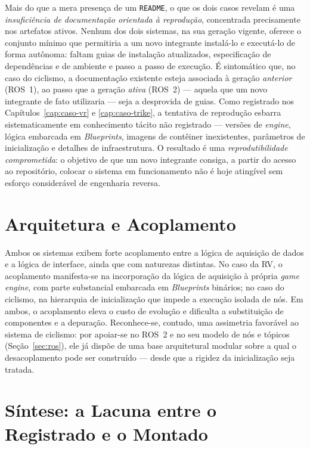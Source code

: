 Mais do que a mera presença de um \texttt{README}, o que os dois casos revelam é uma
\emph{insuficiência de documentação orientada à reprodução}, concentrada precisamente nos
artefatos ativos. Nenhum dos dois sistemas, na sua geração vigente, oferece o conjunto
mínimo que permitiria a um novo integrante instalá-lo e executá-lo de forma autônoma:
faltam guias de instalação atualizados, especificação de dependências e de ambiente e passo
a passo de execução. É sintomático que, no caso do ciclismo, a documentação existente esteja
associada à geração \emph{anterior} (ROS~1), ao passo que a geração \emph{ativa} (ROS~2)
--- aquela que um novo integrante de fato utilizaria --- seja a desprovida de guias. Como
registrado nos Capítulos~\ref{cap:caso-vr} e \ref{cap:caso-trike}, a tentativa de reprodução
esbarra sistematicamente em conhecimento tácito não registrado --- versões de \emph{engine},
lógica embarcada em \emph{Blueprints}, imagens de contêiner inexistentes, parâmetros de
inicialização e detalhes de infraestrutura. O resultado é uma \emph{reprodutibilidade
comprometida}: o objetivo de que um novo integrante consiga, a partir do acesso ao
repositório, colocar o sistema em funcionamento não é hoje atingível sem esforço
considerável de engenharia reversa.

\section{Arquitetura e Acoplamento}
\label{sec:diag-arq}

Ambos os sistemas exibem forte acoplamento entre a lógica de aquisição de dados e a lógica
de interface, ainda que com naturezas distintas. No caso da RV, o acoplamento manifesta-se
na incorporação da lógica de aquisição à própria \emph{game engine}, com parte substancial
embarcada em \emph{Blueprints} binários; no caso do ciclismo, na hierarquia de inicialização
que impede a execução isolada de nós. Em ambos, o acoplamento eleva o custo de evolução e
dificulta a substituição de componentes e a depuração. Reconhece-se, contudo, uma assimetria
favorável ao sistema de ciclismo: por apoiar-se no ROS~2 e no seu modelo de nós e tópicos
(Seção~\ref{sec:ros}), ele já dispõe de uma base arquitetural modular sobre a qual o
desacoplamento pode ser construído --- desde que a rigidez da inicialização seja tratada.

\section{Síntese: a Lacuna entre o Registrado e o Montado}
\label{sec:diag-lacuna}

